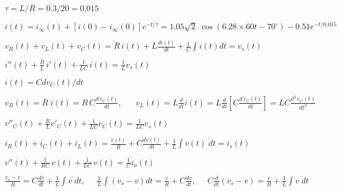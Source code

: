 \documentclass{article}
\def\lthtmlcheckvsize{\ifdim\ht\sizebox<\vsize 
  \ifdim\wd\sizebox<\hsize\expandafter\hfill\fi \expandafter\vfill
  \else\expandafter\vss\fi}%
\begin{document}
{\newpage\clearpage
{}%
$ \tau=L/R=0.3/20=0.015$%
\lthtmlindisplaymathZ
\lthtmlcheckvsize\clearpage}

{\newpage\clearpage
{}%
$\displaystyle i(t)=i_{\infty}(t)+[i(0)-i_{\infty}(0)]e^{-t/\tau}
=1.05\sqrt{2}\;\cos(6.28\times 60 t -70^\circ)-0.51 e^{-t/0.015}$%
\lthtmlindisplaymathZ
\lthtmlcheckvsize\clearpage}

{\newpage\clearpage
{}%
$\displaystyle v_R(t)+v_L(t)+v_C(t)=R\,i(t)+L\frac{di(t)}{dt}+\frac{1}{C}\int i(t) dt=v_s(t)$%
\lthtmlindisplaymathZ
\lthtmlcheckvsize\clearpage}

{\newpage\clearpage
{}%
$\displaystyle i''(t)+\frac{R}{L}\,i'(t)+\frac{1}{LC}\,i(t)=\frac{1}{L}\dot{v}_s(t)$%
\lthtmlindisplaymathZ
\lthtmlcheckvsize\clearpage}

{\newpage\clearpage
{}%
$ i(t)=C dv_C(t)/dt$%
\lthtmlindisplaymathZ
\lthtmlcheckvsize\clearpage}

{\newpage\clearpage
{}%
$\displaystyle v_R(t)=R\;i(t)=R\,C\frac{d\,v_C(t)}{dt},\;\;\;\;\;\;
v_L(t)=L\frac{d}{dt}i(t)=L\frac{d}{dt}\left[C\frac{d\,v_C(t)}{dt} \right]
=LC\frac{d^2\,v_C(t)}{dt^2}$%
\lthtmlindisplaymathZ
\lthtmlcheckvsize\clearpage}

{\newpage\clearpage
{}%
$\displaystyle v''_C(t)+\frac{R}{L} v'_C(t)+\frac{1}{LC}v_C(t)=\frac{1}{LC}v_s(t)$%
\lthtmlindisplaymathZ
\lthtmlcheckvsize\clearpage}

{\newpage\clearpage
{}%
$\displaystyle i_R(t)+i_C(t)+i_L(t)=\frac{v(t)}{R}+C\frac{dv(t)}{dt}+\frac{1}{L}\int v(t)\;dt
=i_s(t)$%
\lthtmlindisplaymathZ
\lthtmlcheckvsize\clearpage}

{\newpage\clearpage
{}%
$\displaystyle v''(t)+\frac{1}{RC}\,v(t)+\frac{1}{LC}\,v(t)=\frac{1}{C}\dot{i}_a(t)$%
\lthtmlindisplaymathZ
\lthtmlcheckvsize\clearpage}

{\newpage\clearpage
{}%
$\displaystyle \frac{v_s-v}{R} = C\frac{dv}{dt}+\frac{1}{L} \int v\;dt,
\;\;\;\;\;
\frac{1}{L}\int (v_s-v)dt = \frac{v}{R}+C\frac{dv}{dt},
\;\;\;\;\;
C\frac{d}{dt} (v_s-v) = \frac{v}{R}+\frac{1}{L} \int v\;dt$%
\lthtmlindisplaymathZ
\lthtmlcheckvsize\clearpage}
\end{document}
